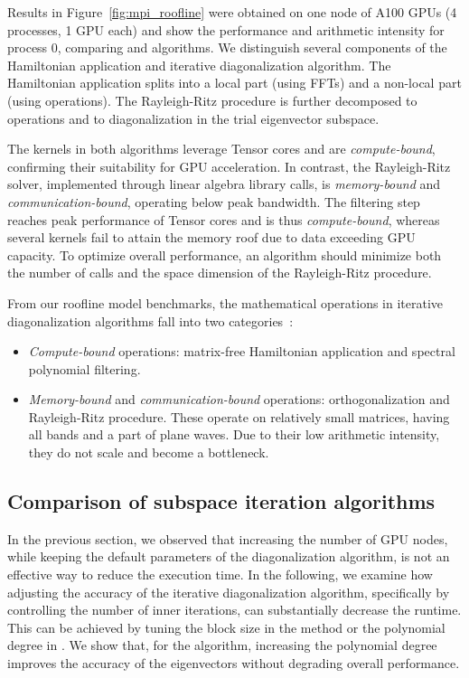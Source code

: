 \documentclass[twocolumn,superscriptaddress]{revtex4-1}
\begin{document}
Results in Figure~\ref{fig:mpi_roofline} were obtained on one node of \nvidia A100 GPUs (4 \mpi processes, 1 GPU each) and show the performance and arithmetic intensity for process 0, comparing \lobpcg and \chebyshevfiltering algorithms.
We distinguish several components of the Hamiltonian application and iterative diagonalization algorithm. The Hamiltonian application splits into a local part (using FFTs) and a non-local part (using \gemm operations). The Rayleigh-Ritz procedure is further decomposed to \gemm operations and to diagonalization in the trial eigenvector subspace.

The \gemm kernels in both algorithms leverage Tensor cores and are \textit{compute-bound}, confirming their suitability for GPU acceleration. In contrast, the Rayleigh-Ritz solver, implemented through \hegvd linear algebra library calls, is \textit{memory-bound} and \textit{communication-bound}, operating below peak bandwidth. The filtering step reaches peak performance of Tensor cores and is thus \textit{compute-bound}, whereas several kernels fail to attain the memory roof due to data exceeding GPU capacity. To optimize overall performance, an algorithm should minimize both the number of calls and the space dimension of the Rayleigh-Ritz procedure.


From our roofline model benchmarks, the mathematical operations in iterative diagonalization algorithms fall into two categories~\cite{10.1145/1498765.1498785}:
\begin{itemize}
\item \textit{Compute-bound} operations: matrix-free Hamiltonian application and spectral polynomial filtering.
\item \textit{Memory-bound} and \textit{communication-bound} operations: orthogonalization and Rayleigh-Ritz procedure. These operate on relatively small matrices, having all bands and a part of plane waves. Due to their low arithmetic intensity, they do not scale and become a bottleneck.
\end{itemize}

\subsection{Comparison of subspace iteration algorithms}\label{sec:per_gpu_si}

In the previous section, we observed that increasing the number of GPU nodes, while keeping the default parameters of the diagonalization algorithm, is not an effective way to reduce the execution time.
In the following, we examine how adjusting the accuracy of the iterative diagonalization algorithm, specifically by controlling the number of inner iterations, can substantially decrease the runtime. This can be achieved by tuning the block size in the \lobpcg method or the polynomial degree in \chebyshevfiltering. We show that, for the \chebyshevfiltering algorithm, increasing the polynomial degree improves the accuracy of the eigenvectors without degrading overall performance.
\end{document}
